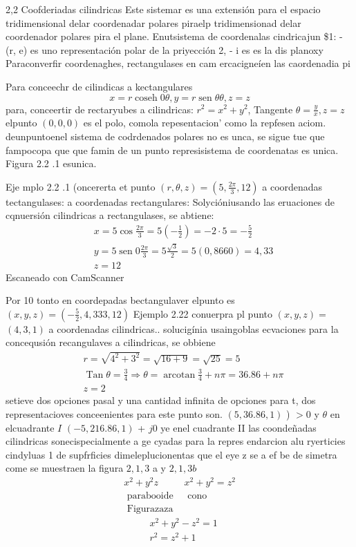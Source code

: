 2,2
Coofderiadas cilindricas
Este sistemar es una extensión para el espacio
tridimensional delar coordenadar polares piraelp tridimensionad delar coordenador polares pira el plane.
Enutsistema de coordenalas cindricajun \$1: - (r, e) es uno representación polar de la priyección 2, - i es es la dis planoxy
Paraconverfir coordenaghes, rectangulases en cam ercacigneíen las caordenadia pi

Para conceechr de cilindicas a kectangulares
$$
x=r \operatorname{coseh} 0 \theta, y=r \operatorname{sen} \theta \theta, z=z
$$
para, conceertir de rectaryubes
a cilindricas:
$r^2=x^2+y^2$, Tangente $\theta=\frac{y}{x}, z=z$
elpunto $(0,0,0)$ es el polo,
comola repesentacion' como la repfesen aciom.
deunpuntoenel sistema
de codrdenados polares no es unca, se sigue tue que fampocopa que que famin de un punto
represisistema de coordenatas
es unica.
Figura 2.2 .1 esunica.

Eje mplo 2.2 .1 (oncererta et punto $(r, \theta, z)=\left(5, \frac{2 \pi}{3}, 12\right)$
a coordenadas tectangulases: a coordenadas rectangulares:
Solycióniusando las eruaciones de cqnuersión cilindricas a rectangulases, se abtiene:
$$
\begin{aligned}
	& x=5 \cos \frac{2 \pi}{3}=5\left(-\frac{1}{2}\right)=-2 \cdot 5=-\frac{5}{2} \\
	& y=5 \operatorname{sen} 0 \frac{2 \pi}{3}=5 \frac{\sqrt{3}}{2}=5(0,8660)=4,33 \\
	& z=12
\end{aligned}
$$
Escaneado con CamScanner




Por 10 tonto en coordepadas bectangulaver elpunto es $(x, y, z)=\left(-\frac{5}{2}, 4,333,12\right)$
Ejemplo 2.22 conuerpra pl punto $(x, y, z)=$
$(4,3,1)$ a coordenadas cilindricas..
solucigínia
usaingoblas ecvaciones para la concequsión
recangulaves a cilindricas, se obbiene
$$
\begin{aligned}
	& r=\sqrt{4^2+3^2}=\sqrt{16+9}=\sqrt{25}=5 \\
	& \operatorname{Tan} \theta=\frac{3}{4} \Rightarrow \theta=\operatorname{arcotan} \frac{3}{4}+n \pi=36.86+n \pi \\
	& z=2
\end{aligned}
$$
setieve dos opciones pasal y una cantidad infinita de opciones para t, dos representacioves conceenientes para este punto son.
$(5,36.86,1)$ ) $>0$ y $\theta$ en elcuadrante $I$ $(-5,216.86,1)$ + $j 0$ ye enel cuadrante II
las coondeñadas cilindricas sonecispecialmente a ge cyadas para la repres endarcion alu ryerticies cindyluas 1 de supfrficies dimeleplucionentas que el eye z se a ef be de simetra come se muestraen la figura $2,1,3$ a y $2,1,3 b$
$$
\begin{array}{ll}
	x^2+y^2 z & x^2+y^2=z^2 \\
	\text { parabooide } & \text { cono } \\
	\text { Figurazaza } &
\end{array}
$$
$$
\begin{aligned}
	& x^2+y^2-z^2=1 \\
	& r^2=z^2+1
\end{aligned}
$$

